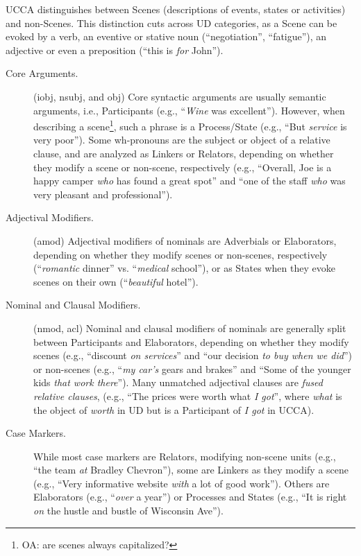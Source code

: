 \documentclass[11pt,a4paper]{article}
\newcommand{\oa}[1]{\footnote{\color{red}OA: #1}}
\begin{document}
UCCA distinguishes between Scenes (descriptions of events, states or activities)
and non-Scenes. 
This distinction cuts across UD categories,
as a Scene can be evoked by a verb, an eventive or stative
noun (``negotiation'', ``fatigue''),
an adjective or even a preposition (``this is \textit{for} John'').
\begin{description}
    \item[Core Arguments.] (iobj, nsubj, and obj)
    Core syntactic arguments are usually semantic arguments,
    i.e., Participants (e.g., ``\textit{Wine} was excellent'').
    However, when describing a scene\oa{are scenes always capitalized?}, such a phrase is a Process/State
    (e.g., ``But \textit{service} is very poor'').
    Some wh-pronouns are the subject or object of a relative clause, and
    are analyzed as Linkers or Relators,
    depending on whether they modify a scene or non-scene, respectively
    (e.g., ``Overall, Joe is a happy camper \textit{who} has found a great spot''
    and ``one of the staff \textit{who} was very pleasant and professional'').
    \item[Adjectival Modifiers.] (amod) 
    Adjectival modifiers of nominals are Adverbials or Elaborators,
    depending on whether they modify scenes or non-scenes, respectively
    (``\textit{romantic} dinner'' vs. ``\textit{medical} school''), or
    as States when
    they evoke scenes on their own (``\textit{beautiful} hotel'').
    \item[Nominal and Clausal Modifiers.] (nmod, acl)
    Nominal and clausal modifiers of nominals
    are generally split between Participants and Elaborators,
    depending on whether they modify scenes
    (e.g., ``discount \textit{on services}'' and
    ``our decision \textit{to buy when we did}'')
    or non-scenes (e.g., ``\textit{my car's} gears and brakes'' and
    ``Some of the younger kids \textit{that work there}'').
    Many unmatched adjectival clauses are
    \textit{fused relative clauses},
    (e.g., ``The prices were worth what \textit{I got}'',
    where \textit{what} is the object of \textit{worth} in UD but
    is a Participant of \textit{I got} in UCCA).
    \item[Case Markers.]
    While most case markers are Relators,
    modifying non-scene units (e.g., ``the team \textit{at} Bradley Chevron''),
    some are Linkers as they modify a scene
    (e.g., ``Very informative website \textit{with} a lot of good work'').
    Others are Elaborators (e.g., ``\textit{over} a year'') or Processes and States
    (e.g., ``It is right \textit{on} the hustle and bustle of Wisconsin Ave'').
    

\end{description}
\end{document}

